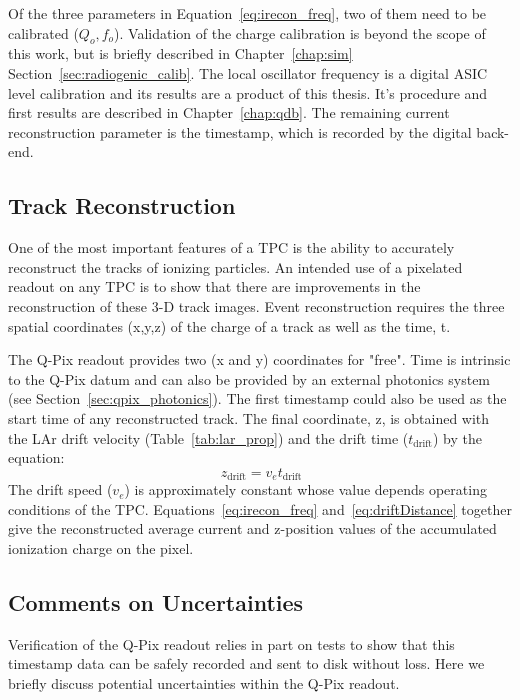 Of the three parameters in Equation~\ref{eq:irecon_freq}, two of them need to be calibrated ($Q_{o}, f_{o}$).
Validation of the charge calibration is beyond the scope of this work, but is briefly described in Chapter~\ref{chap:sim} Section~\ref{sec:radiogenic_calib}.
The local oscillator frequency is a digital ASIC level calibration and its results are a product of this thesis.
It's procedure and first results are described in Chapter~\ref{chap:qdb}.
The remaining current reconstruction parameter is the timestamp, which is recorded by the digital back-end.

\subsection{Track Reconstruction}

One of the most important features of a TPC is the ability to accurately reconstruct the tracks of ionizing particles.
An intended use of a pixelated readout on any TPC is to show that there are improvements in the reconstruction of these 3-D track images.
Event reconstruction requires the three spatial coordinates (x,y,z) of the charge of a track as well as the time, t. 

The Q-Pix readout provides two (x and y) coordinates for "free".
Time is intrinsic to the Q-Pix datum and can also be provided by an external photonics system (see Section~\ref{sec:qpix_photonics}).
The first timestamp could also be used as the start time of any reconstructed track.
The final coordinate, z, is obtained with the LAr drift velocity (Table~\ref{tab:lar_prop}) and the drift time ($t_{\mathrm{drift}}$) by the equation:
\begin{equation}~\label{eq:driftDistance}
  z_{\mathrm{drift}} = v_{e}t_{\mathrm{drift}}
\end{equation}
The drift speed ($v_{e}$) is approximately constant whose value depends operating conditions of the TPC.
Equations~\ref{eq:irecon_freq} and~\ref{eq:driftDistance} together give the reconstructed average current and z-position values of the accumulated ionization charge on the pixel.

\subsection{Comments on Uncertainties}

Verification of the Q-Pix readout relies in part on tests to show that this timestamp data can be safely recorded and sent to disk without loss.
Here we briefly discuss potential uncertainties within the Q-Pix readout.

